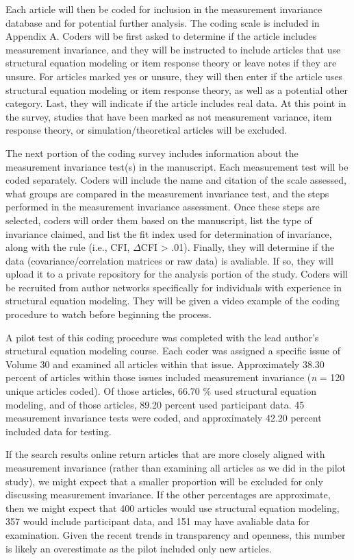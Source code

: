 \documentclass[
  man]{apa7}
\begin{document}
Each article will then be coded for inclusion in the measurement invariance database and for potential further analysis. The coding scale is included in Appendix A. Coders will be first asked to determine if the article includes measurement invariance, and they will be instructed to include articles that use structural equation modeling or item response theory or leave notes if they are unsure. For articles marked yes or unsure, they will then enter if the article uses structural equation modeling or item response theory, as well as a potential other category. Last, they will indicate if the article includes real data. At this point in the survey, studies that have been marked as not measurement variance, item response theory, or simulation/theoretical articles will be excluded.

The next portion of the coding survey includes information about the measurement invariance test(s) in the manuscript. Each measurement test will be coded separately. Coders will include the name and citation of the scale assessed, what groups are compared in the measurement invariance test, and the steps performed in the measurement invariance assessment. Once these steps are selected, coders will order them based on the manuscript, list the type of invariance claimed, and list the fit index used for determination of invariance, along with the rule (i.e., CFI, \(\Delta\)CFI \textgreater{} .01). Finally, they will determine if the data (covariance/correlation matrices or raw data) is avaliable. If so, they will upload it to a private repository for the analysis portion of the study. Coders will be recruited from author networks specifically for individuals with experience in structural equation modeling. They will be given a video example of the coding procedure to watch before beginning the process.

A pilot test of this coding procedure was completed with the lead author's structural equation modeling course. Each coder was assigned a specific issue of Volume 30 and examined all articles within that issue. Approximately 38.30 percent of articles within those issues included measurement invariance (\emph{n} = 120 unique articles coded). Of those articles, 66.70 \% used structural equation modeling, and of those articles, 89.20 percent used participant data. 45 measurement invariance tests were coded, and approximately 42.20 percent included data for testing.

If the search results online return articles that are more closely aligned with measurement invariance (rather than examining all articles as we did in the pilot study), we might expect that a smaller proportion will be excluded for only discussing measurement invariance. If the other percentages are approximate, then we might expect that 400 articles would use structural equation modeling, 357 would include participant data, and 151 may have avaliable data for examination. Given the recent trends in transparency and openness, this number is likely an overestimate as the pilot included only new articles.
\end{document}
